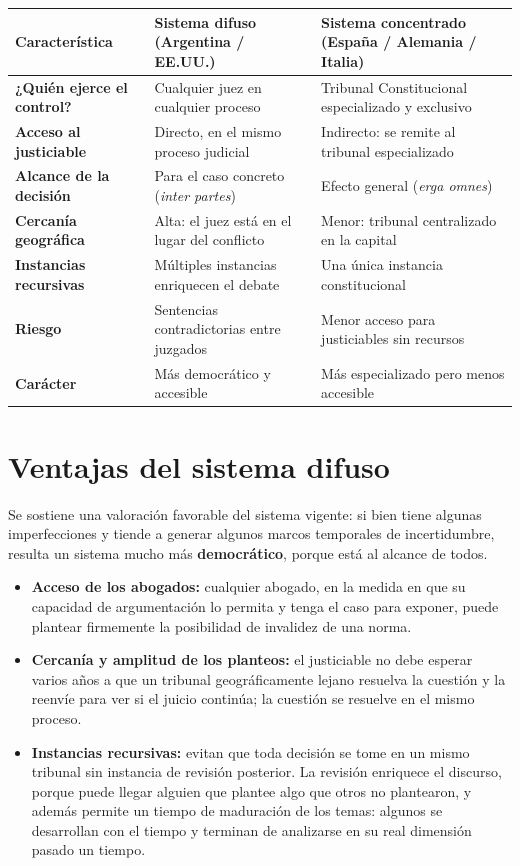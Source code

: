 \documentclass[12pt,oneside]{book}
\begin{document}
\begin{table}[H]
\centering
\small
\begin{tabularx}{\textwidth}{
    >{\raggedright\arraybackslash}p{}
    >{\raggedright\arraybackslash}X
    >{\raggedright\arraybackslash}X
}
\toprule
\textbf{Característica} & \textbf{Sistema difuso (Argentina / EE.UU.)} & \textbf{Sistema concentrado (España / Alemania / Italia)} \\
\midrule
\textbf{¿Quién ejerce el control?} & Cualquier juez en cualquier proceso & Tribunal Constitucional especializado y exclusivo \\
\textbf{Acceso al justiciable} & Directo, en el mismo proceso judicial & Indirecto: se remite al tribunal especializado \\
\textbf{Alcance de la decisión} & Para el caso concreto (\textit{inter partes}) & Efecto general (\textit{erga omnes}) \\
\textbf{Cercanía geográfica} & Alta: el juez está en el lugar del conflicto & Menor: tribunal centralizado en la capital \\
\textbf{Instancias recursivas} & Múltiples instancias enriquecen el debate & Una única instancia constitucional \\
\textbf{Riesgo} & Sentencias contradictorias entre juzgados & Menor acceso para justiciables sin recursos \\
\textbf{Carácter} & Más democrático y accesible & Más especializado pero menos accesible \\
\bottomrule
\end{tabularx}
\end{table}

\section{Ventajas del sistema difuso}

Se sostiene una valoración favorable del sistema vigente: si bien tiene algunas imperfecciones y tiende a generar algunos marcos temporales de incertidumbre, resulta un sistema mucho más \textbf{democrático}, porque está al alcance de todos.

\begin{itemize}
    \item \textbf{Acceso de los abogados:} cualquier abogado, en la medida en que su capacidad de argumentación lo permita y tenga el caso para exponer, puede plantear firmemente la posibilidad de invalidez de una norma.
    \item \textbf{Cercanía y amplitud de los planteos:} el justiciable no debe esperar varios años a que un tribunal geográficamente lejano resuelva la cuestión y la reenvíe para ver si el juicio continúa; la cuestión se resuelve en el mismo proceso.
    \item \textbf{Instancias recursivas:} evitan que toda decisión se tome en un mismo tribunal sin instancia de revisión posterior. La revisión enriquece el discurso, porque puede llegar alguien que plantee algo que otros no plantearon, y además permite un tiempo de maduración de los temas: algunos se desarrollan con el tiempo y terminan de analizarse en su real dimensión pasado un tiempo.
\end{itemize}
\end{document}
